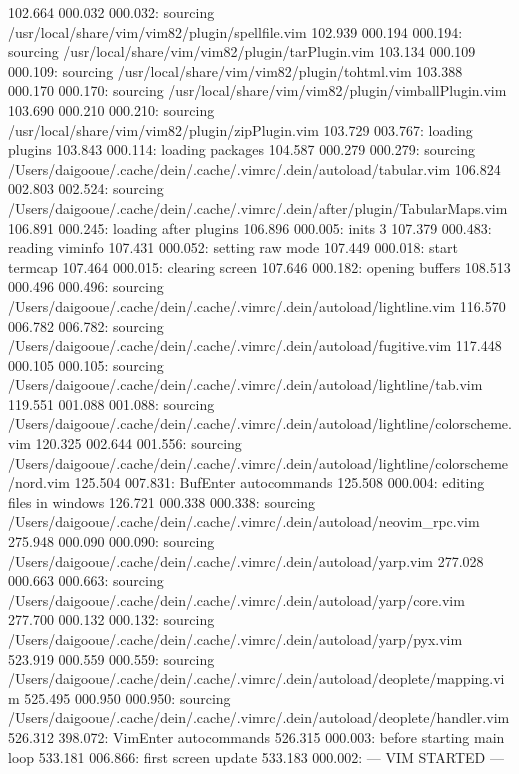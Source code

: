 102.664  000.032  000.032: sourcing /usr/local/share/vim/vim82/plugin/spellfile.vim
102.939  000.194  000.194: sourcing /usr/local/share/vim/vim82/plugin/tarPlugin.vim
103.134  000.109  000.109: sourcing /usr/local/share/vim/vim82/plugin/tohtml.vim
103.388  000.170  000.170: sourcing /usr/local/share/vim/vim82/plugin/vimballPlugin.vim
103.690  000.210  000.210: sourcing /usr/local/share/vim/vim82/plugin/zipPlugin.vim
103.729  003.767: loading plugins
103.843  000.114: loading packages
104.587  000.279  000.279: sourcing /Users/daigooue/.cache/dein/.cache/.vimrc/.dein/autoload/tabular.vim
106.824  002.803  002.524: sourcing /Users/daigooue/.cache/dein/.cache/.vimrc/.dein/after/plugin/TabularMaps.vim
106.891  000.245: loading after plugins
106.896  000.005: inits 3
107.379  000.483: reading viminfo
107.431  000.052: setting raw mode
107.449  000.018: start termcap
107.464  000.015: clearing screen
107.646  000.182: opening buffers
108.513  000.496  000.496: sourcing /Users/daigooue/.cache/dein/.cache/.vimrc/.dein/autoload/lightline.vim
116.570  006.782  006.782: sourcing /Users/daigooue/.cache/dein/.cache/.vimrc/.dein/autoload/fugitive.vim
117.448  000.105  000.105: sourcing /Users/daigooue/.cache/dein/.cache/.vimrc/.dein/autoload/lightline/tab.vim
119.551  001.088  001.088: sourcing /Users/daigooue/.cache/dein/.cache/.vimrc/.dein/autoload/lightline/colorscheme.vim
120.325  002.644  001.556: sourcing /Users/daigooue/.cache/dein/.cache/.vimrc/.dein/autoload/lightline/colorscheme/nord.vim
125.504  007.831: BufEnter autocommands
125.508  000.004: editing files in windows
126.721  000.338  000.338: sourcing /Users/daigooue/.cache/dein/.cache/.vimrc/.dein/autoload/neovim_rpc.vim
275.948  000.090  000.090: sourcing /Users/daigooue/.cache/dein/.cache/.vimrc/.dein/autoload/yarp.vim
277.028  000.663  000.663: sourcing /Users/daigooue/.cache/dein/.cache/.vimrc/.dein/autoload/yarp/core.vim
277.700  000.132  000.132: sourcing /Users/daigooue/.cache/dein/.cache/.vimrc/.dein/autoload/yarp/pyx.vim
523.919  000.559  000.559: sourcing /Users/daigooue/.cache/dein/.cache/.vimrc/.dein/autoload/deoplete/mapping.vim
525.495  000.950  000.950: sourcing /Users/daigooue/.cache/dein/.cache/.vimrc/.dein/autoload/deoplete/handler.vim
526.312  398.072: VimEnter autocommands
526.315  000.003: before starting main loop
533.181  006.866: first screen update
533.183  000.002: --- VIM STARTED ---
